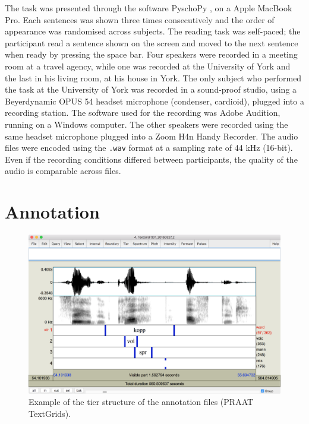\documentclass[11pt,a4paper,openany]{memoir}\usepackage[]{graphicx}\usepackage[]{color}
\begin{document}
The task was presented through the software PyschoPy \citep{peirce2009}, on a Apple MacBook Pro.
Each sentences was shown three times consecutively and the order of appearance was randomised across subjects.
The reading task was self-paced; the participant read a sentence shown on the screen and moved to the next sentence when ready by pressing the space bar.
Four speakers were recorded in a meeting room at a travel agency, while one was recorded at the University of York and the last in his living room, at his house in York.
The only subject who performed the task at the University of York was recorded in a sound-proof studio, using a Beyerdynamic OPUS 54 headset microphone (condenser, cardioid), plugged into a recording station.
The software used for the recording was Adobe Audition, running on a Windows computer.
The other speakers were recorded using the same headset microphone plugged into a Zoom H4n Handy Recorder.
The audio files were encoded using the \texttt{.wav} format at a sampling rate of 44 kHz (16-bit).
Even if the recording conditions differed between participants, the quality of the audio is comparable across files.

\section{Annotation}
\label{s:annotation}

\begin{figure}
\centering
\includegraphics[width=\linewidth]{textgrid}
\caption{Example of the tier structure of the annotation files (PRAAT TextGrids).}
\label{f:textgrid}
\end{figure}
\end{document}
